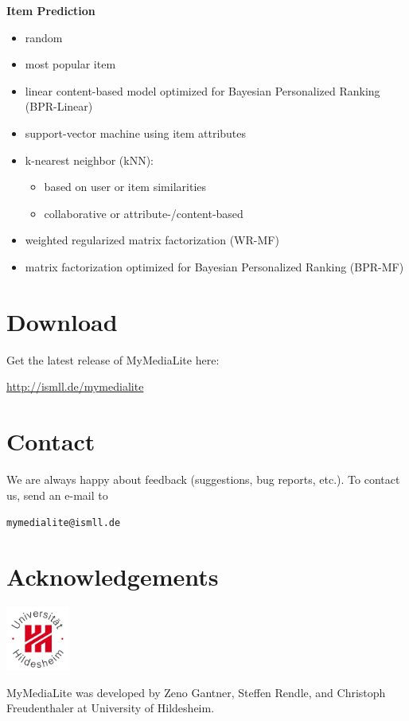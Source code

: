\documentclass[a4paper, foldmark, 12pt]{leaflet}
\begin{document}
\textbf{Item Prediction}
\begin{itemize}
	\item random
	\item most popular item
	\item linear content-based model optimized for Bayesian Personalized Ranking (BPR-Linear)
	\item support-vector machine using item attributes
	\item k-nearest neighbor (kNN):
		\begin{itemize}
			\item based on user or item similarities
			\item collaborative or attribute-/content-based
		\end{itemize}
	\item weighted regularized matrix factorization (WR-MF)
	\item matrix factorization optimized for Bayesian Personalized Ranking (BPR-MF)
\end{itemize}

\newpage

\section{Download}
Get the latest release of MyMediaLite here:
\begin{center}
	\url{http://ismll.de/mymedialite}
\end{center}

\section{Contact}
We are always happy about feedback (suggestions, bug reports, etc.).
To contact us, send an e-mail to
\begin{center}
	\texttt{mymedialite@ismll.de}
\end{center}

\section{Acknowledgements}

\begin{floatingfigure}[r]{1.6cm}
	\vspace{-0.5cm}
	\includegraphics[width=2.1cm]{fig/uni-hildesheim-400x400.jpg}
\end{floatingfigure}
MyMediaLite was developed by Zeno Gantner,
Steffen Rendle, and Christoph Freudenthaler
at University of Hildesheim.
	
\end{document}
